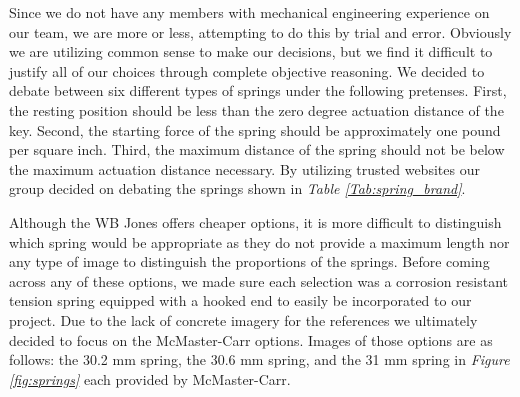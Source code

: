 Since we do not have any members with mechanical engineering experience on our team, we are more or less, attempting to do this by trial and error. Obviously we are utilizing common sense to make our decisions, but we find it difficult to justify all of our choices through complete objective reasoning. We decided to debate between six different types of springs under the following pretenses. First, the resting position should be less than the zero degree actuation distance of the key. Second, the starting force of the spring should be approximately one pound per square inch. Third, the maximum distance of the spring should not be below the maximum actuation distance necessary. By utilizing trusted websites our group decided on debating the springs shown in \textit{Table \ref{Tab:spring_brand}}.

\begin{table}[h!]
  \centering
  \caption{A comparison of costs for our spring options}
  \label{Tab:spring_brand}
\end{table}

Although the WB Jones offers cheaper options, it is more difficult to distinguish which spring would be appropriate as they do not provide a maximum length nor any type of image to distinguish the proportions of the springs. Before coming across any of these options, we made sure each selection was a corrosion resistant tension spring equipped with a hooked end to easily be incorporated to our project. Due to the lack of concrete imagery for the references we ultimately decided to focus on the McMaster-Carr options. Images of those options are as follows: the 30.2 mm spring, the 30.6 mm spring, and the 31 mm spring in \textit{Figure \ref{fig:springs}} each provided by McMaster-Carr.

